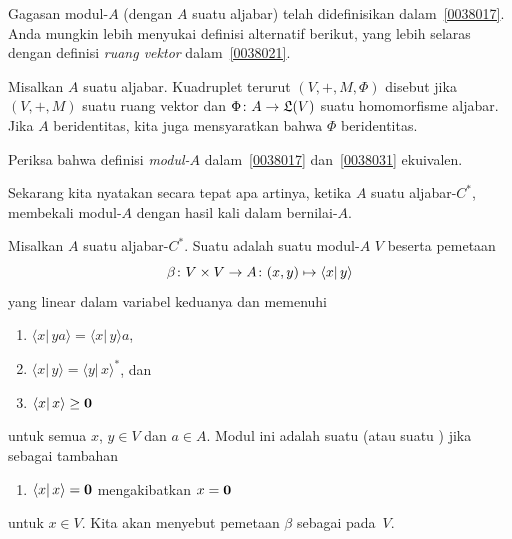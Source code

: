 Gagasan modul-$A$ (dengan $A$ suatu aljabar) telah didefinisikan dalam~\ref{0038017}. Anda
mungkin lebih menyukai definisi alternatif berikut, yang lebih selaras dengan
definisi \emph{ruang vektor} dalam~\ref{0038021}.

\begin{defn}\label{0038031} Misalkan $A$ suatu aljabar. Kuadruplet terurut
$(V,+,M,\Phi)$ disebut  jika $(V,+,M)$ suatu ruang vektor dan $\Phi\colon A \rightarrow \mathfrak{L}(V)$ suatu
homomorfisme aljabar. Jika $A$ beridentitas, kita juga mensyaratkan bahwa $\Phi$ beridentitas.
\end{defn}

\begin{exer} Periksa bahwa definisi \emph{modul-$A$} dalam~\ref{0038017}
dan~\ref{0038031} ekuivalen.
\end{exer}

Sekarang kita nyatakan secara tepat apa artinya, ketika $A$ suatu aljabar-$C^*$, membekali modul-$A$ dengan
hasil kali dalam bernilai-$A$.

\begin{defn} Misalkan $A$ suatu aljabar-$C^*$. Suatu
 adalah suatu modul-$A$ $V$ beserta pemetaan
  \[ \beta\colon V \times V \rightarrow A\colon (x,y) \mapsto \langle x\vert\, y\rangle \]
yang linear dalam variabel keduanya dan memenuhi
 \begin{enumerate}
    \item[(i)] $\langle x\vert\, ya\rangle = \langle x\vert\, y\rangle a$,
    \item[(ii)] $\langle x\vert\, y\rangle = \langle y\vert\, x\rangle^*$, dan
    \item[(iii)] $\langle x\vert\, x\rangle \ge \mathbf{0}$
 \end{enumerate}
untuk semua $x$, $y \in V$ dan $a \in A$. Modul ini adalah suatu
 (atau suatu
) jika sebagai tambahan
 \begin{enumerate}
    \item[(iv)] $\langle x\vert\, x\rangle = \mathbf{0}$ mengakibatkan $x = \mathbf{0}$
 \end{enumerate}
untuk $x \in V$. Kita akan menyebut pemetaan $\beta$ sebagai
 pada~$V$.
\end{defn}

